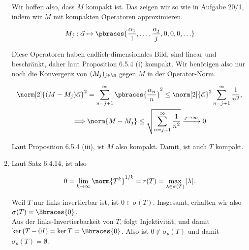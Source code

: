 \begin{solution}
\begin{enumerate}[label = (\alph*)]
  Wir hoffen also, dass $M$ kompakt ist.
  Das zeigen wir so wie in Aufgabe 20/1, indem wir
  $M$ mit kompakten Operatoren approximieren.

  \begin{align*}
    M_j:
    \vec \alpha
    \mapsto
    \pbraces
    {
      \frac{\alpha_1}{1},
      \ldots,
      \frac{\alpha_j}{j},
      0, 0, 0, \ldots
    }
  \end{align*}

  Diese Operatoren haben endlich-dimensionales Bild, sind linear und beschränkt, daher
  laut Proposition 6.5.4 (i) kompakt.
  Wir benötigen also nur noch die Konvergenz von $(M_j)_{j \in \N}$ gegen $M$ in der Operator-Norm.

  \begin{align*}
    \norm[2]{(M - M_j) \vec \alpha}^2
    & =
    \sum_{n = j+1}^\infty
    \pbraces
    {
      \frac{\alpha_n}{n}
    }^2
    \leq
    \norm[2]{\vec \alpha}^2
    \sum_{n = j+1}^\infty
    \frac{1}{n^2}, \\
    \implies &
    \norm{M - M_j}
    \leq
    \sqrt
    {
      \sum_{n = j+1}^\infty
      \frac{1}{n^2}
    }
    \xrightarrow{j \to \infty} 0
  \end{align*}

  Laut Proposition 6.5.4 (iii), ist $M$ also kompakt.
  Damit, ist auch $T$ kompakt.

  \item
  \phantom{}


  Laut Satz 6.4.14, ist also

  \begin{align*}
    0
    =
    \lim_{k \to \infty} \norm{T^k}^{1/k}
    =
    r(T)
    =
    \max_{\lambda \in \sigma(T)} |\lambda|.
  \end{align*}

  Weil $T$ nur links-invertierbar ist, ist $0 \in \sigma(T)$.
  Insgesamt, erhalten wir also $\sigma(T) = \Bbraces{0}$. \\

  Aus der links-Invertierbarkeit von $T$, folgt Injektivität, und damit $\ker{(T - 0 I)} = \ker{T} = \Bbraces{0}$.
  Also ist $0 \notin \sigma_p(T)$ und damit $\sigma_p(T) = \emptyset$.

\end{enumerate}

\end{solution}
